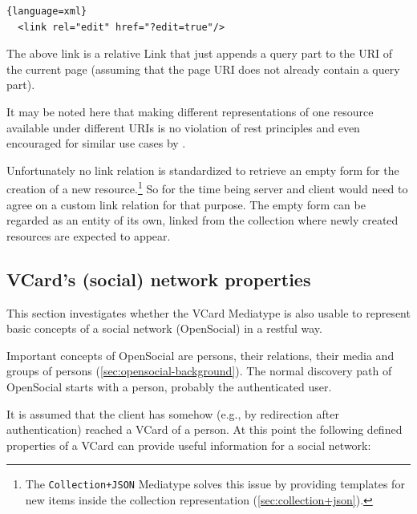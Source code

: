\documentclass[11pt,a4paper,headsepline,twoside]{scrartcl}		%
\begin{document}
\begin{lstlisting}{language=xml}
  <link rel="edit" href="?edit=true"/>
\end{lstlisting}

The above link is a relative Link that just appends a query part to the URI of
the current page (assuming that the page URI does not already contain a query
part).

It may be noted here that making different representations of one resource
available under different URIs is no violation of rest principles and even
encouraged for similar use cases by \cite{Raman2006}.

Unfortunately no link relation is standardized to retrieve an empty form for the
creation of a new resource.\footnote{The \lstinline:Collection+JSON: Mediatype
  solves this issue by providing templates for new items inside the collection
  representation (\autoref{sec:collection+json}).}  So for the time being server
and client would need to agree on a custom link relation for that purpose. The
empty form can be regarded as an entity of its own, linked from the collection
where newly created resources are expected to appear.

\subsection{VCard's (social) network properties}
\label{sec:vcards-soci-netw}

This section investigates whether the VCard Mediatype is also usable to
represent basic concepts of a social network (OpenSocial) in a restful way.

Important concepts of OpenSocial are persons, their relations, their media and
groups of persons (\autoref{sec:opensocial-background}). The normal discovery
path of OpenSocial starts with a person, probably the authenticated user.

It is assumed that the client has somehow (e.g., by redirection after
authentication) reached a VCard of a person. At this point the following defined
properties of a VCard can provide useful information for a social network:
\end{document}
